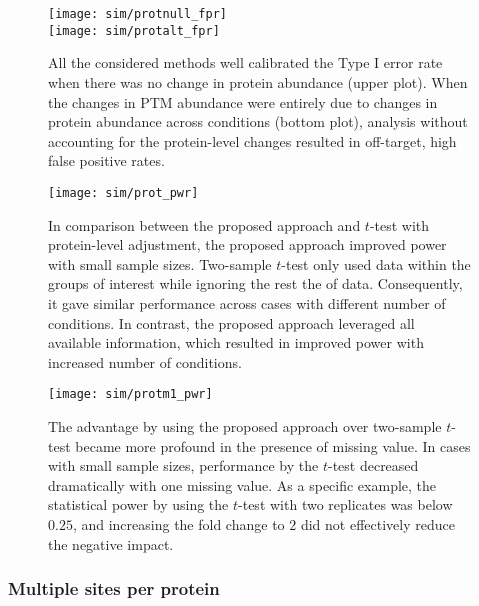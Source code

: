 \documentclass{mcp}
\begin{document}
\begin{figure}[h!]
\centering
\texttt{[image: sim/protnull\_fpr]}\\
\texttt{[image: sim/protalt\_fpr]}
\caption{All the considered methods well calibrated the Type I error rate when there was no change in protein abundance (upper plot). When the
changes in PTM abundance were entirely due to changes in protein abundance across conditions (bottom plot), analysis without accounting for the protein-level changes resulted in off-target, high false positive rates. \label{fig:prot_fpr}}
\end{figure}

\begin{figure}[h!]
\centering
\texttt{[image: sim/prot\_pwr]}
\caption{In comparison between the proposed approach and $t$-test with protein-level adjustment, the proposed approach improved power with small sample sizes. Two-sample $t$-test only used data within the groups of interest while ignoring the rest the of data. Consequently, it gave similar performance across cases with different number of conditions. In contrast, the proposed approach leveraged all available information, which resulted in improved power with increased number of conditions. \label{fig:prot_pwr}}
\end{figure}

\begin{figure}[h!]
\centering
\texttt{[image: sim/protm1\_pwr]}
\caption{The advantage by using the proposed approach over two-sample $t$-test became more profound in the presence of missing value. In cases with small sample sizes, performance by the $t$-test decreased dramatically with one missing value. As a specific example, the statistical power by using the $t$-test with two replicates was below $0.25$, and increasing the fold change to $2$ did not effectively reduce the negative impact. \label{fig:protm1_pwr}}
\end{figure}


\subsubsection{Multiple sites per protein}
\end{document}
